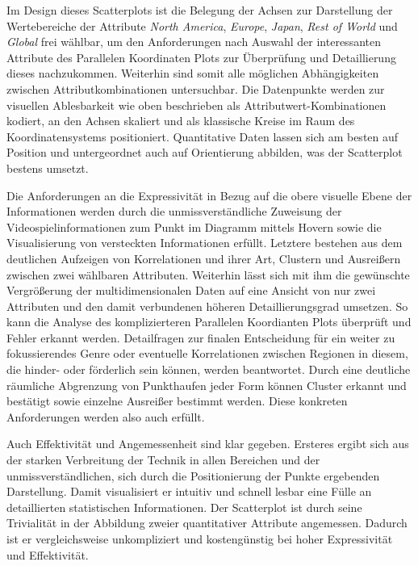 \documentclass[usegeometry=true]{scrartcl}
\begin{document}
Im Design dieses Scatterplots ist die Belegung der Achsen zur Darstellung der Wertebereiche der Attribute \textit{North America}, \textit{Europe}, \textit{Japan}, \textit{Rest of World} und \textit{Global} frei wählbar, 
um den Anforderungen nach Auswahl der interessanten Attribute des Parallelen Koordinaten Plots zur Überprüfung und Detaillierung dieses nachzukommen.
Weiterhin sind somit alle möglichen Abhängigkeiten zwischen Attributkombinationen untersuchbar. 
Die Datenpunkte werden zur visuellen Ablesbarkeit wie oben beschrieben als Attributwert-Kombinationen kodiert, an den Achsen skaliert und als klassische Kreise im Raum des Koordinatensystems positioniert. 
Quantitative Daten lassen sich am besten auf Position und untergeordnet auch auf Orientierung abbilden, was der Scatterplot bestens umsetzt.\cite{Bertin.1982}

Die Anforderungen an die Expressivität in Bezug auf die obere visuelle Ebene der Informationen werden durch die unmissverständliche Zuweisung der Videospielinformationen zum Punkt im Diagramm mittels Hovern sowie die Visualisierung von 
versteckten Informationen erfüllt. 
Letztere bestehen aus dem deutlichen Aufzeigen von Korrelationen und ihrer Art, Clustern und Ausreißern zwischen zwei wählbaren Attributen.
Weiterhin lässt sich mit ihm die gewünschte Vergrößerung der multidimensionalen Daten auf eine Ansicht von nur zwei Attributen und den damit verbundenen höheren Detaillierungsgrad umsetzen. 
So kann die Analyse des komplizierteren Parallelen Koordianten Plots überprüft und Fehler erkannt werden. 
Detailfragen zur finalen Entscheidung für ein weiter zu fokussierendes Genre oder eventuelle Korrelationen zwischen Regionen in diesem, die hinder- oder förderlich sein können, werden beantwortet. 
Durch eine deutliche räumliche Abgrenzung von Punkthaufen jeder Form können Cluster erkannt und bestätigt sowie einzelne Ausreißer bestimmt werden.
Diese konkreten Anforderungen werden also auch erfüllt.

Auch Effektivität und Angemessenheit sind klar gegeben. 
Ersteres ergibt sich aus der starken Verbreitung der Technik in allen Bereichen und der unmissverständlichen, sich durch die Positionierung der Punkte ergebenden Darstellung. 
Damit visualisiert er intuitiv und schnell lesbar eine Fülle an detaillierten statistischen Informationen.
Der Scatterplot ist durch seine Trivialität in der Abbildung zweier quantitativer Attribute angemessen. 
Dadurch ist er vergleichsweise unkompliziert und kostengünstig bei hoher Expressivität und Effektivität.
\end{document}
